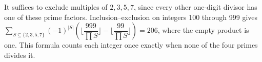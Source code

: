 It suffices to exclude multiples of $2,3,5,7$, since every other one-digit divisor has one of these prime factors. Inclusion--exclusion on integers 100 through 999 gives $\sum_{S\subseteq\{2,3,5,7\}}(-1)^{|S|}(\lfloor\dfrac{999}{\prod S}\rfloor-\lfloor\dfrac{99}{\prod S}\rfloor)=\boxed{206}$, where the empty product is one. This formula counts each integer once exactly when none of the four primes divides it.

